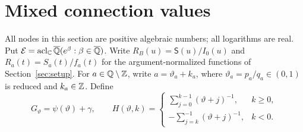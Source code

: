 \section{Mixed connection values}\label{sec:gamma}
All nodes in this section are positive algebraic numbers; all logarithms
are real. Put $\mathcal E=\operatorname{acl}_{\mathbb{C}}{\overline{\mathbb{Q}}}(e^\beta:\beta\in{\overline{\mathbb{Q}}})$.
Write $R_B(u)=\mathsf S(u)/I_0(u)$ and $R_a(t)=S_a(t)/f_a(t)$ for the
argument-normalized functions of Section~\ref{sec:setup}.
For $a\in\mathbb{Q}\setminus\mathbb{Z}$, write $a=\vartheta_a+k_a$, where
$\vartheta_a=p_a/q_a\in(0,1)$ is reduced and $k_a\in\mathbb{Z}$. Define
\[
 G_\vartheta=\psi(\vartheta)+\gamma,\qquad
 H(\vartheta,k)=\begin{cases}
 \sum_{j=0}^{k-1}(\vartheta+j)^{-1},&k\ge0,\\
 -\sum_{j=k}^{-1}(\vartheta+j)^{-1},&k<0.
 \end{cases}
\]
